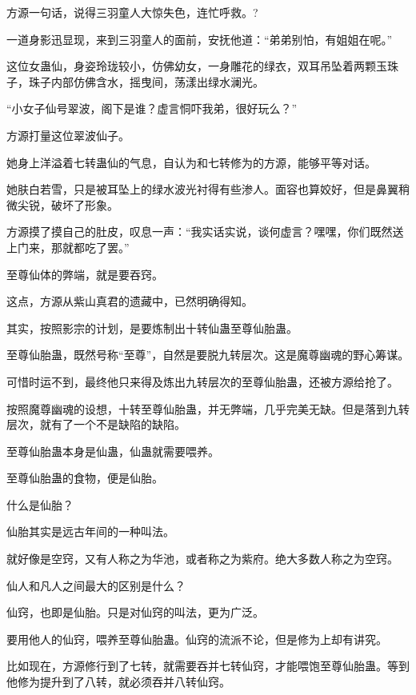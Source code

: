 
\begin{this_body}



方源一句话，说得三羽童人大惊失色，连忙呼救。?

一道身影迅显现，来到三羽童人的面前，安抚他道：“弟弟别怕，有姐姐在呢。”

这位女蛊仙，身姿玲珑较小，仿佛幼女，一身雕花的绿衣，双耳吊坠着两颗玉珠子，珠子内部仿佛含水，摇曳间，荡漾出绿水澜光。

“小女子仙号翠波，阁下是谁？虚言恫吓我弟，很好玩么？”

方源打量这位翠波仙子。

她身上洋溢着七转蛊仙的气息，自认为和七转修为的方源，能够平等对话。

她肤白若雪，只是被耳坠上的绿水波光衬得有些渗人。面容也算姣好，但是鼻翼稍微尖锐，破坏了形象。

方源摸了摸自己的肚皮，叹息一声：“我实话实说，谈何虚言？嘿嘿，你们既然送上门来，那就都吃了罢。”

至尊仙体的弊端，就是要吞窍。

这点，方源从紫山真君的遗藏中，已然明确得知。

其实，按照影宗的计划，是要炼制出十转仙蛊至尊仙胎蛊。

至尊仙胎蛊，既然号称“至尊”，自然是要脱九转层次。这是魔尊幽魂的野心筹谋。

可惜时运不到，最终他只来得及炼出九转层次的至尊仙胎蛊，还被方源给抢了。

按照魔尊幽魂的设想，十转至尊仙胎蛊，并无弊端，几乎完美无缺。但是落到九转层次，就有了一个不是缺陷的缺陷。

至尊仙胎蛊本身是仙蛊，仙蛊就需要喂养。

至尊仙胎蛊的食物，便是仙胎。

什么是仙胎？

仙胎其实是远古年间的一种叫法。

就好像是空窍，又有人称之为华池，或者称之为紫府。绝大多数人称之为空窍。

仙人和凡人之间最大的区别是什么？

仙窍，也即是仙胎。只是对仙窍的叫法，更为广泛。

要用他人的仙窍，喂养至尊仙胎蛊。仙窍的流派不论，但是修为上却有讲究。

比如现在，方源修行到了七转，就需要吞并七转仙窍，才能喂饱至尊仙胎蛊。等到他修为提升到了八转，就必须吞并八转仙窍。


\end{this_body}
